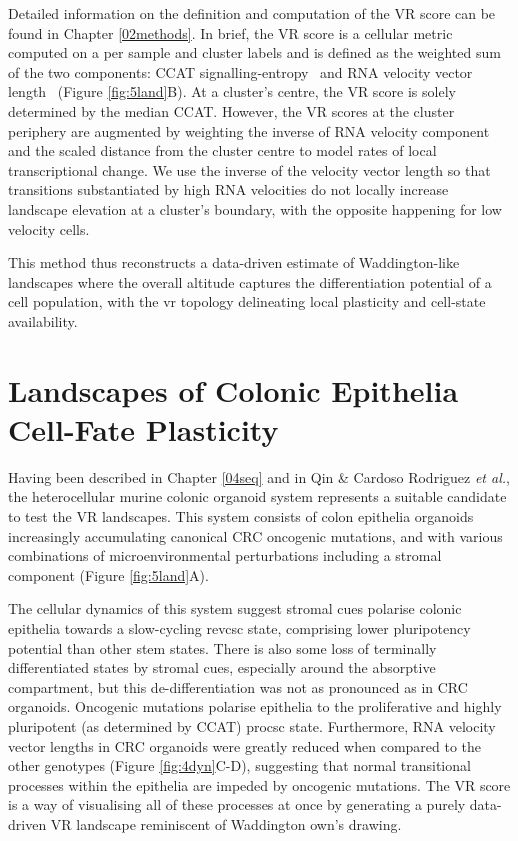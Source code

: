 Detailed information on the definition and computation of the VR score can be found in Chapter \ref{02methods}. In brief, the VR score is a cellular metric computed on a per sample and cluster labels and is defined as the weighted sum of the two components: CCAT signalling-entropy~\cite{teschendorff_single-cell_2017} and RNA velocity vector length~\cite{bergen_generalizing_2020} (Figure \ref{fig:5land}B). 
At a cluster's centre, the VR score is solely determined by the median CCAT. However, the VR scores at the cluster periphery are augmented by weighting the inverse of RNA velocity component and the scaled distance from the cluster centre to model rates of local transcriptional change. We use the inverse of the velocity vector length so that transitions substantiated by high RNA velocities do not locally increase landscape elevation at a cluster's boundary, with the opposite happening for low velocity cells.

This method thus reconstructs a data-driven estimate of Waddington-like landscapes where the overall altitude captures the differentiation potential of a cell population, with the \acrlong{vr} topology delineating local plasticity and cell-state availability. 

\section{Landscapes of Colonic Epithelia Cell-Fate Plasticity}

Having been described in Chapter \ref{04seq} and in Qin \& Cardoso Rodriguez \emph{et al.}, the heterocellular murine colonic organoid system represents a suitable candidate to test the VR landscapes. 
This system consists of colon epithelia organoids increasingly accumulating canonical CRC oncogenic mutations, and with various combinations of microenvironmental perturbations including a stromal component (Figure \ref{fig:5land}A).

The cellular dynamics of this system suggest stromal cues polarise colonic epithelia towards a slow-cycling \acrshort{revcsc} state, comprising lower pluripotency potential than other stem states. There is also some loss of terminally differentiated states by stromal cues, especially around the absorptive compartment, but this de-differentiation was not as pronounced as in CRC organoids.
Oncogenic mutations polarise epithelia to the proliferative and highly pluripotent (as determined by CCAT) \acrshort{procsc} state. Furthermore, RNA velocity vector lengths in CRC organoids were greatly reduced when compared to the other genotypes (Figure \ref{fig:4dyn}C-D), suggesting that normal transitional processes within the epithelia are impeded by oncogenic mutations.
The VR score is a way of visualising all of these processes at once by generating a purely data-driven VR landscape reminiscent of Waddington own's drawing.

